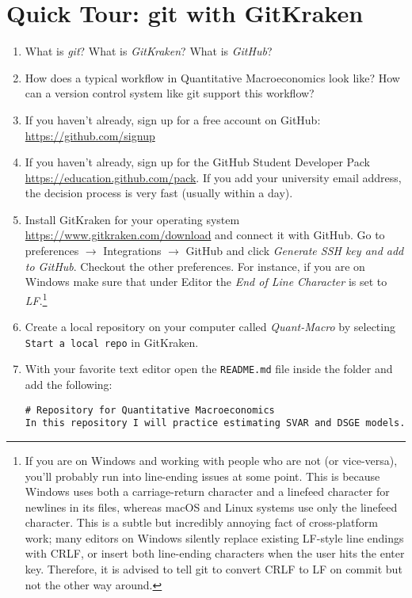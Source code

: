 \section[Quick Tour: git with GitKraken]{Quick Tour: git with GitKraken\label{ex:QuickTourGitWithGitKraken}}
\begin{enumerate}	
	\item What is \emph{git}? What is \emph{GitKraken}? What is \emph{GitHub}?
	\item How does a typical workflow in Quantitative Macroeconomics look like?
	How can a version control system like git support this workflow?
	\item If you haven't already, sign up for a free account on GitHub: \url{https://github.com/signup}
	\item If you haven't already, sign up for the GitHub Student Developer Pack \url{https://education.github.com/pack}. If you add your university email address,
	the decision process is very fast (usually within a day).
	\item Install GitKraken for your operating system \url{https://www.gitkraken.com/download} and connect it with GitHub.
	Go to preferences $\rightarrow$ Integrations $\rightarrow$ GitHub and click \emph{Generate SSH key and add to GitHub}.
	Checkout the other preferences.
	For instance, if you are on Windows make sure that under Editor the \emph{End of Line Character} is set to \emph{LF}.\footnote{
	If you are on Windows and working with people who are not (or vice-versa),
	you'll probably run into line-ending issues at some point.
	This is because Windows uses both a carriage-return character and a linefeed character for newlines in its files,
	  whereas macOS and Linux systems use only the linefeed character.
	This is a subtle but incredibly annoying fact of cross-platform work;
	  many editors on Windows silently replace existing LF-style line endings with CRLF,
	  or insert both line-ending characters when the user hits the enter key.
	Therefore, it is advised to tell git to convert CRLF to LF on commit but not the other way around.}	
	\item Create a local repository on your computer called \emph{Quant-Macro} by selecting \texttt{Start a local repo} in GitKraken.
	\item With your favorite text editor open the \texttt{README.md} file inside the folder and add the following:
\begin{lstlisting}[basicstyle=\scriptsize\mlttfamily]
# Repository for Quantitative Macroeconomics
In this repository I will practice estimating SVAR and DSGE models.

\end{lstlisting}
\end{enumerate}

